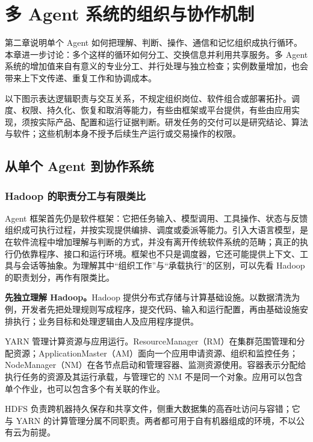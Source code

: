 \documentclass[11pt,a4paper]{article}
\begin{document}
\section{多 Agent 系统的组织与协作机制}

第二章说明单个 Agent 如何把理解、判断、操作、通信和记忆组织成执行循环。本章进一步讨论：多个这样的循环如何分工、交换信息并利用共享服务。多 Agent 系统的增加值来自有意义的专业分工、并行处理与独立检查；实例数量增加，也会带来上下文传递、重复工作和协调成本。

以下图示表达逻辑职责与交互关系，不规定组织岗位、软件组合或部署拓扑。调度、权限、持久化、恢复和取消等能力，有些由框架或平台提供，有些由应用实现，须按实际产品、配置和运行证据判断。研发任务的交付可以是研究结论、算法与软件；这些机制本身不授予后续生产运行或交易操作的权限。

\subsection{从单个 Agent 到协作系统}
\label{sec:architecture}

\subsubsection{Hadoop 的职责分工与有限类比}

Agent 框架首先仍是软件框架：它把任务输入、模型调用、工具操作、状态与反馈组织成可执行过程，并按实现提供编排、调度或委派等能力。引入大语言模型，是在软件流程中增加理解与判断的方式，并没有离开传统软件系统的范畴；真正的执行仍依靠程序、接口和运行环境。框架也不只是调度器，它还可能提供上下文、工具与会话等抽象。为理解其中“组织工作”与“承载执行”的区别，可以先看 Hadoop 的职责划分，再作有限类比。

\textbf{先独立理解 Hadoop。}Hadoop 提供分布式存储与计算基础设施。以数据清洗为例，开发者先把处理规则写成程序，提交代码、输入和运行配置，再由基础设施安排执行；业务目标和处理逻辑由人及应用程序提供。

YARN 管理计算资源与应用运行。ResourceManager（RM）在集群范围管理和分配资源；ApplicationMaster（AM）面向一个应用申请资源、组织和监控任务；NodeManager（NM）在各节点启动和管理容器、监测资源使用。容器表示分配给执行任务的资源及其运行承载，与管理它的 NM 不是同一个对象。应用可以包含单个作业，也可以包含多个有关联的作业\cite{hadoop-yarn}。

HDFS 负责跨机器持久保存和共享文件，侧重大数据集的高吞吐访问与容错；它与 YARN 的计算管理分属不同职责。两者都可用于自有机器组成的环境，不以公有云为前提\cite{hadoop-hdfs}。
\end{document}
